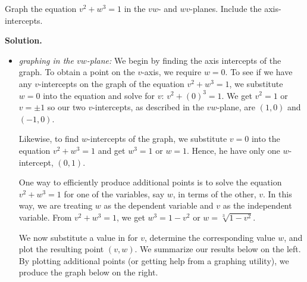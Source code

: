 \begin{ex}   \label{firstequgraph} Graph the equation $v^2 + w^3 = 1$ in  the $vw$- and $wv$-planes.  Include the axis-intercepts. 


{\bf Solution.}  

\begin{itemize}

\item \textit{graphing in the $vw$-plane:}  We begin by finding the axis intercepts of the graph.  To obtain a point on the $v$-axis, we require $w = 0$.  To see if we have any $v$-intercepts on the graph of the equation $v^2+w^3 = 1$, we substitute $w=0$ into the equation and solve for $v$:  $v^2 + (0)^3 = 1$.  We get $v^2 = 1$ or $v = \pm 1$ so our two $v$-intercepts, as described in the $vw$-plane, are $(1,0)$ and $(-1,0)$. 

\smallskip

Likewise, to find $w$-intercepts of the graph, we substitute $v = 0$ into the equation $v^2+w^3 = 1$ and get $w^3 = 1$ or $w = 1$. Hence, he have only one $w$-intercept, $(0,1)$.  

\smallskip

One way to efficiently produce additional points is to solve the equation $v^2+w^3 = 1$ for one of the variables, say $w$, in terms of the other, $v$.  In this way, we are treating $w$ as the dependent variable and $v$ as the independent variable.  From  $v^2 + w^3 = 1$, we get $w^3 = 1 - v^2$ or $w = \sqrt[3]{1-v^2}$. 

\smallskip

We now substitute a value in for $v$, determine the corresponding value $w$, and plot the resulting point $(v,w)$.   We summarize our results below on the left.  By plotting additional points (or getting help from a graphing utility), we produce the graph below on the right.
 
 \begin{center}
\end{center}
\end{itemize}
\end{ex}

